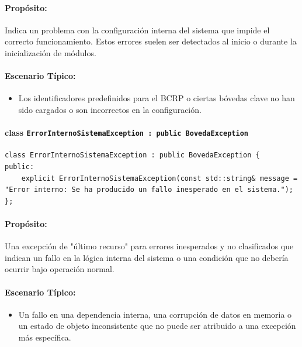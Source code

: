 \documentclass{article}
\newcommand{\inlinecode}[1]{\texttt{#1}}
\begin{document}
\paragraph*{Propósito:} Indica un problema con la configuraci\'on interna del sistema que impide el correcto funcionamiento. Estos errores suelen ser detectados al inicio o durante la inicializaci\'on de m\'odulos.

\paragraph*{Escenario Típico:}
\begin{itemize}
    \item Los identificadores predefinidos para el BCRP o ciertas b\'ovedas clave no han sido cargados o son incorrectos en la configuraci\'on.
\end{itemize}

\paragraph*{\textbf{class \inlinecode{ErrorInternoSistemaException : public BovedaException}}}
\vspace{2mm} %
\begin{lstlisting}
class ErrorInternoSistemaException : public BovedaException {
public:
    explicit ErrorInternoSistemaException(const std::string& message = "Error interno: Se ha producido un fallo inesperado en el sistema.");
};
\end{lstlisting}
\paragraph*{Propósito:} Una excepci\'on de "\'ultimo recurso" para errores inesperados y no clasificados que indican un fallo en la l\'ogica interna del sistema o una condici\'on que no deber\'ia ocurrir bajo operaci\'on normal.

\paragraph*{Escenario Típico:}
\begin{itemize}
    \item Un fallo en una dependencia interna, una corrupci\'on de datos en memoria o un estado de objeto inconsistente que no puede ser atribuido a una excepci\'on m\'as espec\'ifica.
\end{itemize}
\end{document}
